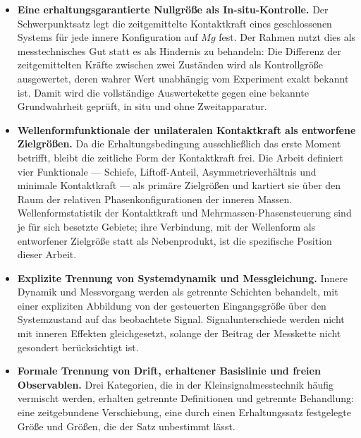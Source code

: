 \documentclass[12pt,a4paper]{report}
\begin{document}
\begin{itemize}

  \item \textbf{Eine erhaltungsgarantierte Nullgröße als In-situ-Kontrolle.}
        Der Schwerpunktsatz legt die zeitgemittelte Kontaktkraft eines
        geschlossenen Systems für jede innere Konfiguration auf $Mg$
        fest. Der Rahmen nutzt dies als messtechnisches Gut statt es als
        Hindernis zu behandeln: Die Differenz der zeitgemittelten Kräfte
        zwischen zwei Zuständen wird als Kontrollgröße ausgewertet, deren
        wahrer Wert unabhängig vom Experiment exakt bekannt ist. Damit
        wird die vollständige Auswertekette gegen eine bekannte
        Grundwahrheit geprüft, in situ und ohne Zweitapparatur.

  \item \textbf{Wellenformfunktionale der unilateralen Kontaktkraft als
        entworfene Zielgrößen.}
        Da die Erhaltungsbedingung ausschließlich das erste Moment
        betrifft, bleibt die zeitliche Form der Kontaktkraft frei. Die
        Arbeit definiert vier Funktionale --- Schiefe, Liftoff-Anteil,
        Asymmetrieverhältnis und minimale Kontaktkraft --- als primäre
        Zielgrößen und kartiert sie über den Raum der relativen
        Phasenkonfigurationen der inneren Massen. Wellenformstatistik der
        Kontaktkraft und Mehrmassen-Phasensteuerung sind je für sich
        besetzte Gebiete; ihre Verbindung, mit der Wellenform als
        entworfener Zielgröße statt als Nebenprodukt, ist die spezifische
        Position dieser Arbeit.

  \item \textbf{Explizite Trennung von Systemdynamik und Messgleichung.}
        Innere Dynamik und Messvorgang werden als getrennte Schichten
        behandelt, mit einer expliziten Abbildung von der gesteuerten
        Eingangsgröße über den Systemzustand auf das beobachtete Signal.
        Signalunterschiede werden nicht mit inneren Effekten
        gleichgesetzt, solange der Beitrag der Messkette nicht gesondert
        berücksichtigt ist.

  \item \textbf{Formale Trennung von Drift, erhaltener Basislinie und
        freien Observablen.}
        Drei Kategorien, die in der Kleinsignalmesstechnik häufig
        vermischt werden, erhalten getrennte Definitionen und getrennte
        Behandlung: eine zeitgebundene Verschiebung, eine durch einen
        Erhaltungssatz festgelegte Größe und Größen, die der Satz
        unbestimmt lässt.


\end{itemize}
\end{document}
